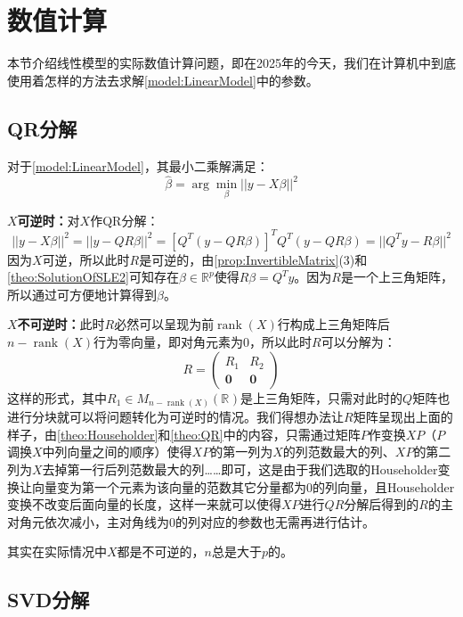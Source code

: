 \section{数值计算}

本节介绍线性模型的实际数值计算问题，即在2025年的今天，我们在计算机中到底使用着怎样的方法去求解\cref{model:LinearModel}中的参数。

\subsection{QR分解}
对于\cref{model:LinearModel}，其最小二乘解满足：
\begin{equation*}
	\hat{\beta}=\arg\min_{\beta}||y-X\beta||^2
\end{equation*}\par
\textbf{$X$可逆时：}对$X$作QR分解：
\begin{equation*}
	||y-X\beta||^2=||y-QR\beta||^2=[Q^T(y-QR\beta)]^TQ^T(y-QR\beta)=||Q^Ty-R\beta||^2
\end{equation*}
因为$X$可逆，所以此时$R$是可逆的，由\cref{prop:InvertibleMatrix}(3)和\cref{theo:SolutionOfSLE2}可知存在$\beta\in\mathbb{R}^{p}$使得$R\beta=Q^Ty$。因为$R$是一个上三角矩阵，所以通过可方便地计算得到$\beta$。\par
\textbf{$X$不可逆时：}此时$R$必然可以呈现为前$\operatorname{rank}(X)$行构成上三角矩阵后$n-\operatorname{rank}(X)$行为零向量，即对角元素为$0$，所以此时$R$可以分解为：
\begin{equation*}
	R=
	\begin{pmatrix}
		R_1 & R_2 \\
		\mathbf{0} & \mathbf{0}
	\end{pmatrix}
\end{equation*}
这样的形式，其中$R_1\in M_{n-\operatorname{rank}(X)}(\mathbb{R}^{})$是上三角矩阵，只需对此时的$Q$矩阵也进行分块就可以将问题转化为可逆时的情况。我们得想办法让$R$矩阵呈现出上面的样子，由\cref{theo:Householder}和\cref{theo:QR}中的内容，只需通过矩阵$P$作变换$XP$（$P$调换$X$中列向量之间的顺序）使得$XP$的第一列为$X$的列范数最大的列、$XP$的第二列为$X$去掉第一行后列范数最大的列……即可，这是由于我们选取的Householder变换让向量变为第一个元素为该向量的范数其它分量都为$0$的列向量，且Householder变换不改变后面向量的长度，这样一来就可以使得$XP$进行$QR$分解后得到的$R$的主对角元依次减小，主对角线为$0$的列对应的参数也无需再进行估计。\par
\begin{note}
	其实在实际情况中$X$都是不可逆的，$n$总是大于$p$的。
\end{note}

\subsection{SVD分解}